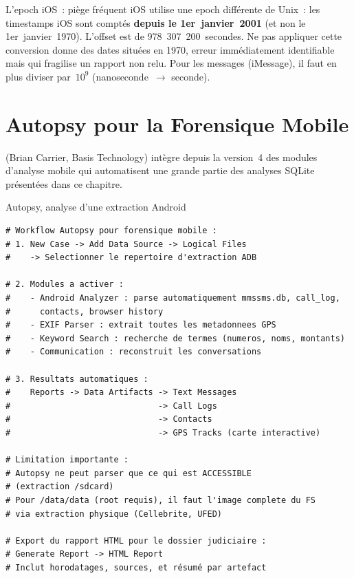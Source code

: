 \begin{boiteRemarque}{L'epoch iOS~: piège fréquent}
iOS utilise une epoch différente de Unix~: les timestamps iOS sont
comptés \textbf{depuis le 1er~janvier~2001} (et non le
1er~janvier~1970). L'offset est de 978~307~200~secondes.
Ne pas appliquer cette conversion donne des dates situées en 1970,
erreur immédiatement identifiable mais qui fragilise un rapport non relu.
Pour les messages (iMessage), il faut en plus diviser par~$10^9$
(nanoseconde~$\to$ seconde).
\end{boiteRemarque}

\section{Autopsy pour la Forensique Mobile}
\label{sec:autopsy-mobile}

 (Brian Carrier, Basis Technology)
intègre depuis la version~4 des modules d'analyse mobile qui automatisent
une grande partie des analyses SQLite présentées dans ce chapitre.

\begin{boxoutils}{Autopsy, analyse d'une extraction Android}
\begin{lstlisting}[language=bash_forensique]
# Workflow Autopsy pour forensique mobile :
# 1. New Case -> Add Data Source -> Logical Files
#    -> Selectionner le repertoire d'extraction ADB

# 2. Modules a activer :
#    - Android Analyzer : parse automatiquement mmssms.db, call_log,
#      contacts, browser history
#    - EXIF Parser : extrait toutes les metadonnees GPS
#    - Keyword Search : recherche de termes (numeros, noms, montants)
#    - Communication : reconstruit les conversations

# 3. Resultats automatiques :
#    Reports -> Data Artifacts -> Text Messages
#                              -> Call Logs
#                              -> Contacts
#                              -> GPS Tracks (carte interactive)

# Limitation importante :
# Autopsy ne peut parser que ce qui est ACCESSIBLE
# (extraction /sdcard)
# Pour /data/data (root requis), il faut l'image complete du FS
# via extraction physique (Cellebrite, UFED)

# Export du rapport HTML pour le dossier judiciaire :
# Generate Report -> HTML Report
# Inclut horodatages, sources, et résumé par artefact
\end{lstlisting}
\end{boxoutils}

